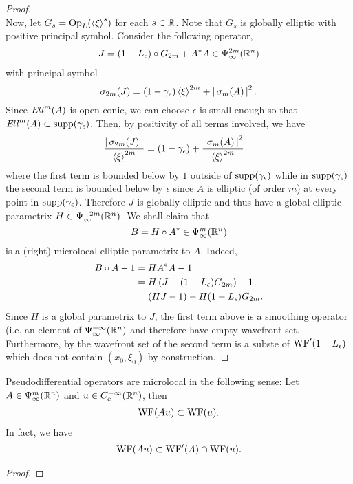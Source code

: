 \documentclass[12pt]{article}
\begin{document}
\begin{proof}
    \\
    Now, let $G_s = \mathrm{Op}_L(\sym[\xi]^s)$ for each $s \in \R$. Note that $G_s$ is globally elliptic with positive principal symbol. Consider the following operator, 
    \begin{align*}
    J = (1 - L_\epsilon) \circ G_{2m} + A^* A \in \Psi^{2m}_\infty(\R^n)
    \end{align*}
    with principal symbol 
    \[
    \sigma_{2m}(J) = (1 - \gamma_\epsilon)\sym[\xi]^{2m} + \abs{\sigma_m(A)}^2. 
    \]
    Since $\Ell^m(A)$ is open conic, we can choose $\epsilon$ is small enough so that $\Ell^{m}(A) \subset \supp(\gamma_\epsilon)$. Then, by positivity of all terms involved, we have
    \begin{align*}
    \frac{\abs{\sigma_{2m}(J)} }{\sym[\xi]^{2m}}
    &= (1 - \gamma_\epsilon) + \frac{\abs{\sigma_m(A)}^2}{\sym[\xi]^{2m}}
    \end{align*}
    where the first term is bounded below by $1$ outside of $\supp(\gamma_\epsilon)$ while in $\supp(\gamma_\epsilon)$ the second term is bounded below by $\epsilon$ since $A$ is elliptic (of order $m$) at every point in $\supp(\gamma_\epsilon)$. Therefore $J$ is globally elliptic and thus have a global elliptic parametrix $H \in \Psi^{-2m}_\infty(\R^n)$. We shall claim that 
    \[
    B = H \circ A^* \in \Psi^m_\infty(\R^n)
    \]
    is a (right) microlocal elliptic parametrix to $A$. Indeed, 
    \begin{align*}
    B \circ A - 1 
    &= H A^*A - 1 \\
    &= H\brac{J - (1 - L_\epsilon)G_{2m}} - 1\\
    &= (HJ - 1) - H(1 - L_\epsilon)G_{2m}. 
    \end{align*}
    Since $H$ is a global parametrix to $J$, the first term above is a smoothing operator (i.e. an element of $\Psi^{-\infty}_\infty(\R^n)$ and therefore have empty wavefront set. Furthermore, by \cite{wavefront of compositiion} the wavefront set of the second term is a subste of $\WF'(1 - L_\epsilon)$ which does not contain $(x_0, \xi_0)$ by construction. 
\end{proof}

\begin{fprop}
    Pseudodifferential operators are microlocal in the following sense: 
    Let $A \in \Psi^m_\infty(\R^n)$ and $u \in C^{-\infty}_c(\R^n)$, then 
    \begin{align}
    \WF(Au) \subset \WF(u). 
    \end{align}
    In fact, we have 
    \begin{align*}
    \WF(Au) \subset \WF'(A) \cap \WF(u). 
    \end{align*}
\end{fprop}
\begin{proof}
    
\end{proof}
\end{document}
